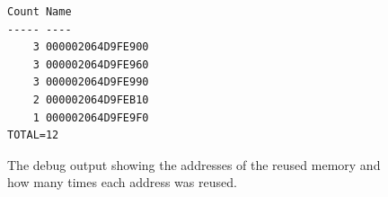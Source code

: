 \begin{figure}
\begin{verbatim}
Count Name
----- ----
    3 000002064D9FE900
    3 000002064D9FE960
    3 000002064D9FE990
    2 000002064D9FEB10
    1 000002064D9FE9F0
TOTAL=12
\end{verbatim}
    \caption{The debug output showing the addresses of the reused memory and how many times each address was reused.}
    \label{fig:reuse_result}
\end{figure}
